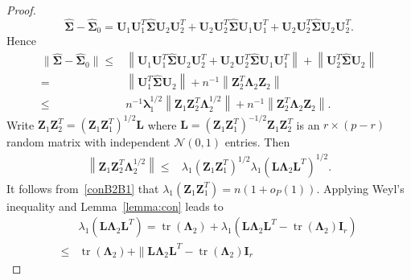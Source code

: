 \documentclass[12pt]{article} %
\DeclareMathOperator{\mytr}{tr}
\newcommand{\bZ}{\mathbf{Z}}
\newcommand{\bI}{\mathbf{I}}
\newcommand{\bU}{\mathbf{U}}
\newcommand{\bL}{\mathbf{L}}
\newcommand{\bfsym}[1]{\ensuremath{\boldsymbol{#1}}}
\def\blambda {\bfsym {\lambda}}
\def\bLambda {\bfsym {\Lambda}}
\def\bSigma {\bfsym {\Sigma}}
\theoremstyle{definition}
\begin{document}
\begin{appendices}
\begin{proof}
    \begin{equation*}
        \hat{\bSigma}-\hat{\bSigma}_0 
        =
        \bU_1\bU_1^T \hat{\bSigma}\bU_2\bU_2^T + \bU_2\bU_2^T \hat{\bSigma}\bU_1\bU_1^T
        +\bU_2\bU_2^T \hat{\bSigma}\bU_2\bU_2^T
        .
    \end{equation*}
    Hence
    \begin{equation*}
        \begin{split}
            \|\hat{\bSigma}-\hat{\bSigma}_0 \| 
        \leq &
        \left\|
        \bU_1\bU_1^T \hat{\bSigma}\bU_2\bU_2^T + \bU_2\bU_2^T \hat{\bSigma}\bU_1\bU_1^T
        \right\|
        +
\left\| 
        \bU_2^T \hat{\bSigma}\bU_2
\right\|
        \\
        =&
         \left\|\bU_1^T \hat{\bSigma}\bU_2\right\|
        +
        n^{-1}\left\| 
        \bZ_2^T \bLambda_2 \bZ_2
\right\|
        \\
        \leq&
        n^{-1} \blambda_1^{1/2}\left\| \bZ_1 \bZ_2^T \bLambda_2^{1/2}\right\|
        +
        n^{-1}\left\| 
        \bZ_2^T \bLambda_2 \bZ_2
        \right\|.
        \end{split}
    \end{equation*}
    Write $\bZ_1 \bZ_2^T
        = (\bZ_1 \bZ_1^T)^{1/2} \bL $
    where $\bL=(\bZ_1 \bZ_1^T)^{-1/2}\bZ_1\bZ_2^T$ is an $r\times (p-r)$ random matrix with independent $\mathcal{N} (0,1)$ entries.
    Then
\begin{equation*}
    \begin{split}
 \left\| \bZ_1 \bZ_2^T \bLambda_2^{1/2}\right\|
        \leq &
        \lambda_1\left(  \bZ_1 \bZ_1^T \right)^{1/2}
        \lambda_1\left(\bL \bLambda_2 \bL^T \right)^{1/2}.
    \end{split}
\end{equation*}
It follows from~\eqref{conB2B1} that
$\lambda_1\left(  \bZ_1 \bZ_1^T \right)
=
n(1+o_P(1))$.
Applying Weyl's inequality and Lemma~\ref{lemma:con} leads to
\begin{equation*}
    \begin{split}
        &\lambda_1\left( \bL \bLambda_2 \bL^T \right) 
        =\mytr(\bLambda_2)+
        \lambda_1\left( \bL \bLambda_2 \bL^T - 
        \mytr(\bLambda_2) \bI_r
        \right) 
        \\
        \leq&
        \mytr(\bLambda_2)+
        \| \bL \bLambda_2 \bL^T - 
        \mytr(\bLambda_2) \bI_r

\end{split}
\end{equation*}
\end{proof}
\end{appendices}
\end{document}
